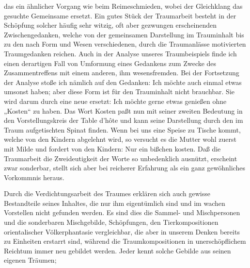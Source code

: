 \documentclass{article}
\begin{document}
         
            
            
            
        \pstart
        das ein ähnlicher Vorgang wie beim Reimeschmieden, wobei der
               Gleichklang das gesuchte Gemeinsame ersetzt. Ein gutes Stück der Traumarbeit
               besteht in der Schöpfung solcher häufig sehr witzig, oft aber gezwungen
               erscheinenden Zwischengedanken, welche von der gemeinsamen Darstellung im
               Trauminhalt bis zu den nach Form und Wesen verschiedenen, durch die Traumanlässe motivierten Traumgedanken reichen. Auch in der Analyse
               unseres Traumbeispiels finde ich einen derartigen Fall von Umformung
               eines Gedankens zum Zwecke des Zusammentreffens mit einem anderen, ihm
               wesensfremden. Bei der Fortsetzung der Analyse stoße ich nämlich auf den
               Gedanken: Ich möchte auch einmal etwas umsonst haben;
               aber diese Form ist für den Trauminhalt nicht brauchbar. Sie wird darum
               durch eine neue ersetzt: Ich möchte gerne etwas genießen ohne „Kosten“ zu haben. Das
               Wort Kosten paßt nun mit seiner zweiten
               Bedeutung in den Vorstellungskreis der Table d’hôte und kann seine Darstellung
               durch den im Traum aufgetischten Spinat finden.
               Wenn bei uns eine Speise zu Tische kommt, welche von den Kindern abgelehnt wird,
               so versucht es die Mutter wohl zuerst mit Milde und fordert von den
               Kindern: Nur ein bißchen kosten. Daß die Traumarbeit die Zweideutigkeit der Worte so unbedenklich ausnützt,
               erscheint zwar sonderbar, stellt sich aber bei reicherer Erfahrung als ein ganz
               gewöhnliches Vorkommnis heraus.
        \pend
    
            
        \pstart
        Durch die Verdichtungsarbeit des Traumes erklären sich auch gewisse Bestandteile
               seines Inhaltes, die nur ihm eigentümlich sind und im wachen Vorstellen nicht
               gefunden werden. Es sind dies die Sammel- und
                  Mischpersonen und die sonderbaren
                  Mischgebilde, Schöpfungen, den
               Tierkompositionen orientalischer Völkerphantasie vergleichbar, die aber in
               unserem Denken bereits zu Einheiten erstarrt sind, während die Traumkompositionen in unerschöpflichem Reichtum immer neu gebildet
               werden. Jeder kennt solche Gebilde aus seinen eigenen Träumen;
        \pend
    
\end{document}
